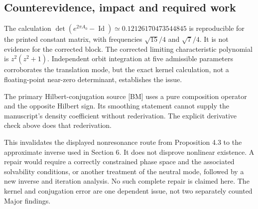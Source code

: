 \documentclass[10pt]{article}
\begin{document}
\subsection*{Counterevidence, impact and required work}
The calculation \(\det(e^{2\pi A_0}-\operatorname{Id})\simeq0.12126170473544845\) is reproducible for the printed constant matrix, with frequencies \(\sqrt{15}/4\) and \(\sqrt7/4\). It is not evidence for the corrected block. The corrected limiting characteristic polynomial is \(z^2(z^2+1)\). Independent orbit integration at five admissible parameters corroborates the translation mode, but the exact kernel calculation, not a floating-point near-zero determinant, establishes the issue.\par
The primary Hilbert-conjugation source [BM] uses a pure composition operator and the opposite Hilbert sign. Its smoothing statement cannot supply the manuscript’s density coefficient without rederivation. The explicit derivative check above does that rederivation.\par
This invalidates the displayed nonresonance route from Proposition 4.3 to the approximate inverse used in Section 6. It does not disprove nonlinear existence. A repair would require a correctly constrained phase space and the associated solvability conditions, or another treatment of the neutral mode, followed by a new inverse and iteration analysis. No such complete repair is claimed here. The kernel and conjugation error are one dependent issue, not two separately counted Major findings.\par
\end{document}
